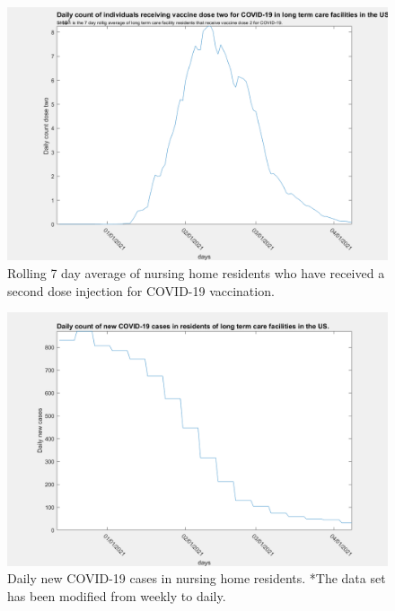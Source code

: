 \documentclass[twoside]{article}
\begin{document}
\begin{multicols}{2}
\begin{figure}[H]
	\includegraphics[width=\linewidth]{images/usa_daily_ltc_second_dose_processed.png}
	\caption{Rolling 7 day average of nursing home residents who have received a second dose injection for COVID-19 vaccination.}
	\label{fig:images/usa_daily_ltc_second_dose_processedLabel}
\end{figure}

\begin{figure}[H]
	\includegraphics[width=\linewidth]{images/usa_daily_ltc_cases_unprocessed.png}
	\caption{Daily new COVID-19 cases in nursing home residents. *The data set has been modified from weekly to daily.}
	\label{fig:images/usa_daily_ltc_cases_unprocessedLabel}
\end{figure}


\end{multicols}
\end{document}
